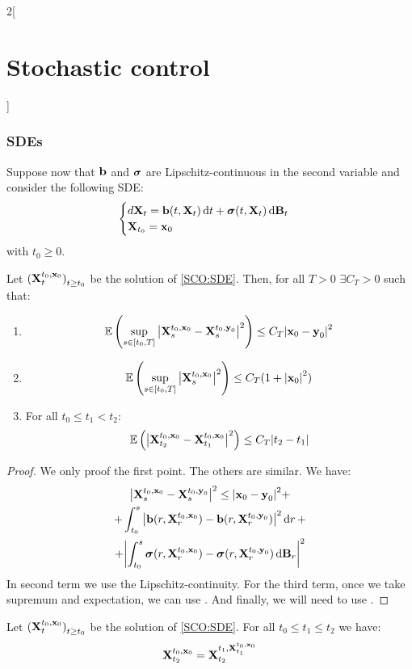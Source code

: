 \documentclass[../../../main_math.tex]{subfiles}
\begin{document}
\begin{multicols}{2}[\section{Stochastic control}]
  \subsubsection{SDEs}
  Suppose now that $\boldsymbol{\mathrm{b}}$ and $\boldsymbol{\mathrm{\sigma}}$ are Lipschitz-continuous in the second variable and consider the following SDE:
  \begin{equation}\label{SCO:SDE}
    \begin{cases}
      d\boldsymbol{\mathrm{X}}_t=\boldsymbol{\mathrm{b}}(t,\boldsymbol{\mathrm{X}}_t)\dd{t}+\boldsymbol{\mathrm{\sigma}}(t,\boldsymbol{\mathrm{X}}_t)\dd{\boldsymbol{\mathrm{B}}_t} \\
      \boldsymbol{\mathrm{X}}_{t_0}=\boldsymbol{\mathrm{x}}_0
    \end{cases}
  \end{equation}
  with $t_0\geq 0$.
  \begin{proposition}
    Let ${(\boldsymbol{\mathrm{X}}_t^{t_0,\boldsymbol{\mathrm{x}}_0})}_{t\geq t_0}$ be the solution of \eqref{SCO:SDE}. Then, for all $T>0$ $\exists C_T>0$ such that:
    \begin{enumerate}
      \item
            $$
              \mathbb{E}\left(\sup_{s\in [t_0,T]}\abs{\boldsymbol{\mathrm{X}}_s^{t_0,\boldsymbol{\mathrm{x}}_0}-\boldsymbol{\mathrm{X}}_s^{t_0,\boldsymbol{\mathrm{y}}_0}}^2\right)\leq C_T\abs{\boldsymbol{\mathrm{x}}_0-\boldsymbol{\mathrm{y}}_0}^2
            $$
      \item $$
              \mathbb{E}\left(\sup_{s\in [t_0,T]}\abs{\boldsymbol{\mathrm{X}}_s^{t_0,\boldsymbol{\mathrm{x}}_0}}^2\right)\leq C_T(1+\abs{\boldsymbol{\mathrm{x}}_0}^2)
            $$
      \item For all $t_0\leq t_1<t_2$:
            $$
              \mathbb{E}\left(\abs{\boldsymbol{\mathrm{X}}_{t_2}^{t_0,\boldsymbol{\mathrm{x}}_0}-\boldsymbol{\mathrm{X}}_{t_1}^{t_0,\boldsymbol{\mathrm{x}}_0}}^2\right)\leq C_T\abs{t_2-t_1}
            $$
    \end{enumerate}
  \end{proposition}
  \begin{proof}
    We only proof the first point. The others are similar. We have:
    \begin{multline*}
      \abs{\boldsymbol{\mathrm{X}}_s^{t_0,\boldsymbol{\mathrm{x}}_0}-\boldsymbol{\mathrm{X}}_s^{t_0,\boldsymbol{\mathrm{y}}_0}}^2\leq \abs{\boldsymbol{\mathrm{x}}_0-\boldsymbol{\mathrm{y}}_0}^2+\\+\int_{t_0}^s \abs{\boldsymbol{\mathrm{b}}(r,\boldsymbol{\mathrm{X}}_r^{t_0,\boldsymbol{\mathrm{x}}_0})-\boldsymbol{\mathrm{b}}(r,\boldsymbol{\mathrm{X}}_r^{t_0,\boldsymbol{\mathrm{y}}_0})}^2\dd{r}+\\+\abs{\int_{t_0}^s \boldsymbol{\mathrm{\sigma}}(r,\boldsymbol{\mathrm{X}}_r^{t_0,\boldsymbol{\mathrm{x}}_0})-\boldsymbol{\mathrm{\sigma}}(r,\boldsymbol{\mathrm{X}}_r^{t_0,\boldsymbol{\mathrm{y}}_0})\dd{\boldsymbol{\mathrm{B}}_r}}^2
    \end{multline*}
    In second term we use the Lipschitz-continuity. For the third term, once we take supremum and expectation, we can use . And finally, we will need to use .
  \end{proof}
  \begin{proposition}
    Let ${(\boldsymbol{\mathrm{X}}_t^{t_0,\boldsymbol{\mathrm{x}}_0})}_{t\geq t_0}$ be the solution of \eqref{SCO:SDE}. For all $t_0\leq t_1\leq t_2$ we have: $$\boldsymbol{\mathrm{X}}_{t_2}^{t_0,\boldsymbol{\mathrm{x}}_0}=\boldsymbol{\mathrm{X}}_{t_2}^{t_1,\boldsymbol{\mathrm{X}}_{t_1}^{t_0,\boldsymbol{\mathrm{x}}_0}}$$
  \end{proposition}

\end{multicols}
\end{document}
